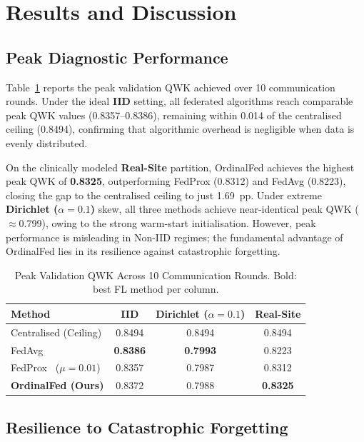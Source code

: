 \section{Results and Discussion}
\label{sec:results}

\subsection{Peak Diagnostic Performance}

Table~\ref{tab:results} reports the peak validation QWK achieved over 10
communication rounds. Under the ideal \textbf{IID} setting, all federated algorithms
reach comparable peak QWK values (0.8357--0.8386), remaining within 0.014 of the
centralised ceiling (0.8494), confirming that algorithmic overhead is negligible
when data is evenly distributed.

On the clinically modeled \textbf{Real-Site} partition, OrdinalFed achieves the
highest peak QWK of \textbf{0.8325}, outperforming FedProx (0.8312) and FedAvg
(0.8223), closing the gap to the centralised ceiling to just 1.69~pp. Under extreme
\textbf{Dirichlet ($\alpha=0.1$)} skew, all three methods achieve near-identical
peak QWK ($\approx$0.799), owing to the strong warm-start initialisation. However,
peak performance is misleading in Non-IID regimes; the fundamental advantage of
OrdinalFed lies in its resilience against catastrophic forgetting.

\begin{table}[t]
\caption{Peak Validation QWK Across 10 Communication Rounds.
Bold: best FL method per column.}
\label{tab:results}
\centering
\setlength{\tabcolsep}{5pt}
\begin{tabular}{@{}lccc@{}}
\toprule
\textbf{Method} &
\textbf{IID} &
\textbf{Dirichlet ($\alpha=0.1$)} &
\textbf{Real-Site} \\
\midrule
Centralised (Ceiling) & 0.8494 & 0.8494 & 0.8494 \\
\midrule
FedAvg~\cite{mcmahan2017fedavg}
  & \textbf{0.8386} & \textbf{0.7993} & 0.8223 \\
FedProx~\cite{li2020fedprox} ($\mu=0.01$)
  & 0.8357 & 0.7987 & 0.8312 \\
\textbf{OrdinalFed (Ours)}
  & 0.8372 & 0.7988 & \textbf{0.8325} \\
\bottomrule
\end{tabular}
\end{table}

\subsection{Resilience to Catastrophic Forgetting}

